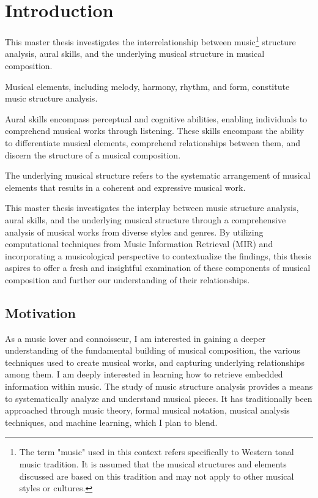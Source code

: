 \normallinespacing

\chapter{Introduction}

This master thesis investigates the interrelationship between music\footnote{The term "music" used in this context refers specifically to Western tonal music tradition. It is assumed that the musical structures and elements discussed are based on this tradition and may not apply to other musical styles or cultures.} structure analysis, aural skills, and the underlying musical structure in musical composition. 

Musical elements, including melody, harmony, rhythm, and form, constitute music structure analysis. 

Aural skills encompass perceptual and cognitive abilities, enabling individuals to comprehend musical works through listening. These skills encompass the ability to differentiate musical elements, comprehend relationships between them, and discern the structure of a musical composition. 

The underlying musical structure refers to the systematic arrangement of musical elements that results in a coherent and expressive musical work. 

This master thesis investigates the interplay between music structure analysis, aural skills, and the underlying musical structure through a comprehensive analysis of musical works from diverse styles and genres. By utilizing computational techniques from Music Information Retrieval (MIR) and incorporating a musicological perspective to contextualize the findings, this thesis aspires to offer a fresh and insightful examination of these components of musical composition and further our understanding of their relationships.

\section{Motivation}

As a music lover and connoisseur, I am interested in gaining a deeper understanding of the fundamental building of musical composition, the various techniques used to create musical works, and capturing underlying relationships among them. I am deeply interested in learning how to retrieve embedded information within music. The study of music structure analysis provides a means to systematically analyze and understand musical pieces. It has traditionally been approached through music theory, formal musical notation, musical analysis techniques, and machine learning, which I plan to blend.

